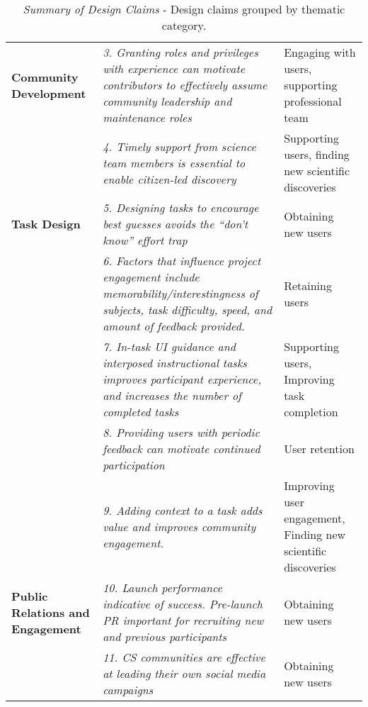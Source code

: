 \documentclass{sigchi}
\begin{document}
\begin{spacing}{0.97}
\begin{spacing}{0.8}
\begin{table*}[ht!]
\begin{tabular}{p{2.5cm}p{10cm}p{4cm}}
\textbf{Community Development} & \emph{3. Granting roles and privileges with experience can motivate contributors to effectively assume community leadership and maintenance roles} & Engaging with users, supporting professional team\\

& \emph{4. Timely support from science team members is essential to enable citizen-led discovery} & Supporting users, finding new scientific discoveries \\

\hline
\textbf{Task Design} & \emph{5. Designing tasks to encourage best guesses avoids the ``don't know'' effort trap} & Obtaining new users\\

& \emph{6. Factors that influence project engagement include memorability/interestingness of subjects, task difficulty, speed, and amount of feedback provided.} & Retaining users \\

& \emph{7. In-task UI guidance and interposed instructional tasks improves participant experience, and increases the number of completed tasks} & Supporting users, Improving task completion \\

& \emph{8. Providing users with periodic feedback can motivate continued participation} & User retention\\

& \emph{9. Adding context to a task adds value and improves community engagement.} & Improving user engagement, Finding new scientific discoveries\\

\hline
\textbf{Public Relations and Engagement} & \emph{10. Launch performance indicative of success. Pre-launch PR important for recruiting new and previous participants} & Obtaining new users\\

& \emph{11. CS communities are effective at leading their own social media campaigns} & Obtaining new users\\

\hline
\hline
\end{tabular}
\caption{\emph{Summary of Design Claims} - Design claims grouped by thematic category.}
\label{tbl:recommendations}
\normalsize
\end{table*}
\end{spacing}




\end{spacing}
\end{document}
